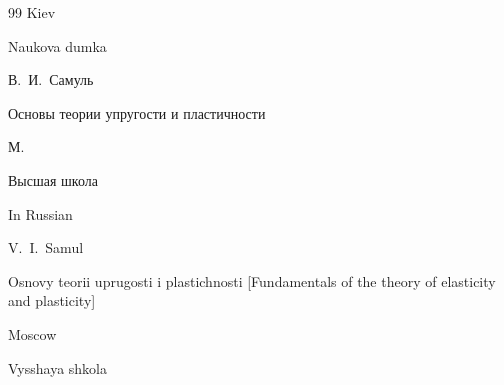 \begin{thebibliography}{99}
\publaddr Kiev

\publ Naukova dumka










\by В.~И.~Самуль

\book Основы теории упругости и пластичности

\publaddr М.

\publ Высшая школа



\misctransl

\lang In Russian

\by  V.~I.~Samul

\book Osnovy teorii uprugosti i plastichnosti \rm [Fundamentals of the theory of elasticity and plasticity]

\publaddr Moscow

\publ Vysshaya shkola







\end{thebibliography}











\renewcommand{\correctvfill}{\newpage}





\makeentitle






%



\renewcommand{\baselinestretch}{0.9}





 \newpage




%

